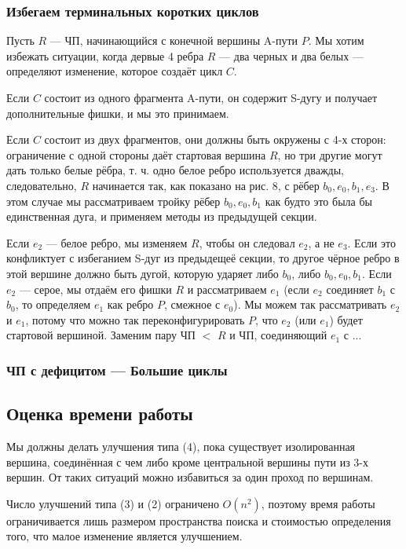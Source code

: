 \begin{proofstar}
\subsubsection{Избегаем терминальных коротких циклов}
Пусть $R$ --- ЧП, начинающийся с конечной вершины A-пути $P$. Мы хотим избежать ситуации, когда дервые 4 ребра $R$ --- два черных и два белых --- определяют изменение, которое создаёт цикл $C$. 

Если $C$ состоит из одного фрагмента A-пути, он содержит S-дугу и получает дополнительные фишки, и мы это принимаем.

Если $C$ состоит из двух фрагментов, они должны быть окружены с 4-х сторон: ограничение с одной стороны даёт стартовая вершина $R$, но три другие могут дать только белые рёбра, т. ч. одно белое ребро используется дважды, следовательно, $R$ начинается так, как показано на рис. 8, с рёбер $b_0, e_0, b_1, e_3$. В этом случае мы рассматриваем тройку рёбер $b_0, e_0, b_1$ как будто это была бы единственная дуга, и применяем методы из предыдущей секции.

Если $e_2$ --- белое ребро, мы изменяем $R$, чтобы он следовал $e_2$, а не $e_3$. Если это конфликтует с избеганием S-дуг из предыдещеё секции, то другое чёрное ребро в этой вершине должно быть дугой, которую ударяет либо $b_0$, либо $b_0, e_0, b_1$. Если $e_2$ --- серое, мы отдаём его фишки $R$ и рассматриваем $e_1$ (если $e_2$ соединяет $b_1$ с $b_0$, то определяем $e_1$ как ребро $P$, смежное с $e_0$). Мы можем так рассматривать $e_2$ и $e_1$, потому что можно так переконфигурировать $P$, что $e_2$ (или $e_1$) будет стартовой вершиной. Заменим пару ЧП $<$ $R$ и ЧП, соединяющий $e_1$ с ... 


\subsubsection{ЧП с дефицитом --- Большие циклы}

\subsection{Оценка времени работы}
Мы должны делать улучшения типа (4), пока существует изолированная вершина, соединённая с чем либо кроме центральной вершины пути из 3-х вершин. От таких ситуаций можно избавиться за один проход по вершинам.

Число улучшений типа (3) и (2) ограничено $O(n^2)$, поэтому время работы ограничивается лишь размером пространства поиска и стоимостью определения того, что малое изменение является улучшением.


\end{proofstar}
